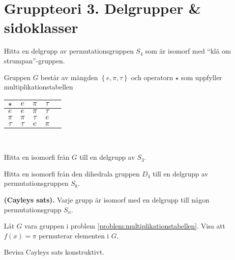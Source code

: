 \documentclass[11pt,fleqn]{book} %
\begin{document}
\renewcommand*\rmdefault{ppl}\normalfont\upshape

\chapter{Gruppteori 3. Delgrupper \& sidoklasser}
\large
\thispagestyle{empty}

\begin{problem}
  Hitta en delgrupp av permutationsgruppen \(S_4\) som är isomorf med ``klä om strumpan''-gruppen.
\end{problem}

\begin{problem} \label{problem:multiplikationstabellen}
  Gruppen \(G\) består av mängden \(\left\{e, \pi , \tau\right\}\) och operatorn \(\star\) som uppfyller multiplikationstabellen 
  { \center
  \begin{tabular}{c|cccc}
    \( \star \) & \(e\) & \(\pi \) & \(\tau\) \\ \midrule
    \(e\) & \(e\) & \(\pi\) & \(\tau\) \\
    \(\pi\) & \(\pi \) & \(\tau\) & \(e\) \\
    \(\tau\) & \(\tau \) & \(e\) & \(\pi\) \\
  \end{tabular}\\}
  \vspace{2ex}
  \noindent Hitta en isomorfi från \(G\) till en delgrupp av \(S_3\). %
\end{problem}

\begin{problem}
	Hitta en isomorfi från den dihedrala gruppen \(D_4\) till en delgrupp av permutationsgruppen \(S_8\).
\end{problem}

\begin{theoremeT} \textbf{(Cayleys sats).} Varje grupp är isomorf med en delgrupp till någon permutationsgrupp \(S_n\).
\end{theoremeT}

\begin{problem}
  Låt \(G\) vara gruppen i problem \ref{problem:multiplikationstabellen}. Visa att \(f(x) = \pi\) permuterar elementen i \(G\).
\end{problem}

\begin{problem}
	Bevisa Cayleys sats konstruktivt.
\end{problem}
\end{document}
